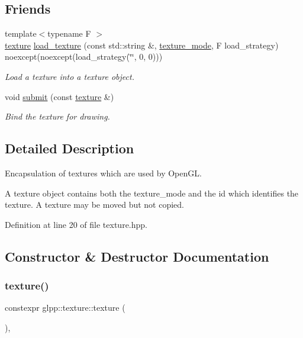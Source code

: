 \subsection*{Friends}
\begin{DoxyCompactItemize}
\item 
{\footnotesize template$<$typename F $>$ }\\\hyperlink{classglpp_1_1texture}{texture} \hyperlink{classglpp_1_1texture_adaa62c117269049a04e9ce958c0d9856}{load\+\_\+texture} (const std\+::string \&, \hyperlink{namespaceglpp_a09dd2630cf15f1c3f3b4164c59cc7d26}{texture\+\_\+mode}, F load\+\_\+strategy) noexcept(noexcept(load\+\_\+strategy(\char`\"{}\char`\"{}, 0, 0)))
\begin{DoxyCompactList}\small\item\em Load a texture into a texture object. \end{DoxyCompactList}\item 
void \hyperlink{classglpp_1_1texture_ac40bc6b16cee4dbf15c0562ce550da18}{submit} (const \hyperlink{classglpp_1_1texture}{texture} \&)
\begin{DoxyCompactList}\small\item\em Bind the texture for drawing. \end{DoxyCompactList}\end{DoxyCompactItemize}


\subsection{Detailed Description}
Encapsulation of textures which are used by Open\+GL. 

A texture object contains both the texture\+\_\+mode and the id which identifies the texture. A texture may be moved but not copied. 

Definition at line 20 of file texture.\+hpp.



\subsection{Constructor \& Destructor Documentation}
\mbox{\label{classglpp_1_1texture_a185be01a6e7167e5fc8797df2fa927d3}} 
\subsubsection{\texorpdfstring{texture()}{texture()}\hspace{0.1cm}{\footnotesize\ttfamily [1/4]}}
{\footnotesize\ttfamily constexpr glpp\+::texture\+::texture (\begin{DoxyParamCaption}{ }\end{DoxyParamCaption})\hspace{0.3cm}{\ttfamily [inline]}, {\ttfamily [noexcept]}}



